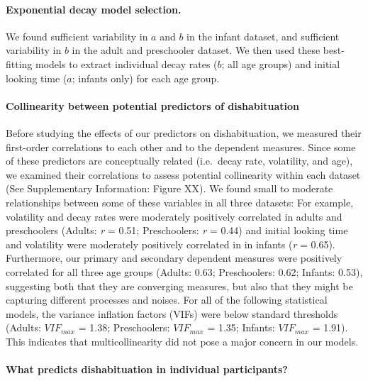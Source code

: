 \documentclass[10pt, letterpaper]{article}
\begin{document}
\hypertarget{exponential-decay-model-selection.}{%
\paragraph{Exponential decay model
selection.}\label{exponential-decay-model-selection.}}

We found sufficient variability in \(a\) and \(b\) in the infant
dataset, and sufficient variability in \(b\) in the adult and
preschooler dataset. We then used these best-fitting models to extract
individual decay rates (\(b\); all age groups) and initial looking time
(\(a\); infants only) for each age group.

\hypertarget{collinearity-between-potential-predictors-of-dishabituation}{%
\paragraph{Collinearity between potential predictors of
dishabituation}\label{collinearity-between-potential-predictors-of-dishabituation}}

Before studying the effects of our predictors on dishabituation, we
measured their first-order correlations to each other and to the
dependent measures. Since some of these predictors are conceptually
related (i.e.~decay rate, volatility, and age), we examined their
correlations to assess potential collinearity within each dataset (See
Supplementary Information: Figure XX). We found small to moderate
relationships between some of these variables in all three datasets: For
example, volatility and decay rates were moderately positively
correlated in adults and preschoolers (Adults: \emph{r} = 0.51;
Preschoolers: \emph{r} = 0.44) and initial looking time and volatility
were moderately positively correlated in in infants (\emph{r} = 0.65).
Furthermore, our primary and secondary dependent measures were
positively correlated for all three age groups (Adults: 0.63;
Preschoolers: 0.62; Infants: 0.53), suggesting both that they are
converging measures, but also that they might be capturing different
processes and noises. For all of the following statistical models, the
variance inflation factors (VIFs) were below standard thresholds
(Adults: \(VIF_{max}\) = 1.38; Preschoolers: \(VIF_{max}\) = 1.35;
Infants: \(VIF_{max}\) = 1.91). This indicates that multicollinearity
did not pose a major concern in our models.

\hypertarget{what-predicts-dishabituation-in-individual-participants}{%
\paragraph{What predicts dishabituation in individual
participants?}\label{what-predicts-dishabituation-in-individual-participants}}
\end{document}
